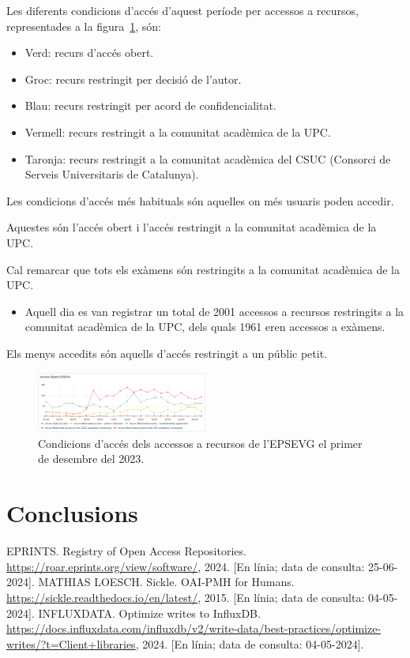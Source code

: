 \documentclass[lettersize,journal]{IEEEtran}
\begin{document}
Les diferents condicions d'accés d'aquest període per accessos a recursos, representades a la figura~\ref{fig:log-access-type}, són:
\begin{itemize}
    \item Verd: recurs d'accés obert.
    \item Groc: recurs restringit per decisió de l'autor.
    \item Blau: recurs restringit per acord de confidencialitat.
    \item Vermell: recurs restringit a la comunitat acadèmica de la UPC.
    \item Taronja: recurs restringit a la comunitat acadèmica del CSUC (Consorci de Serveis Universitaris de Catalunya).
\end{itemize}

Les condicions d'accés més habituals són aquelles on més usuaris poden accedir.

Aquestes són l'accés obert i l'accés restringit a la comunitat acadèmica de la UPC.

Cal remarcar que tots els exàmens són restringits a la comunitat acadèmica de la UPC.
\begin{itemize}
    \item Aquell dia es van registrar un total de 2001 accessos a recursos restringits a la comunitat acadèmica de la UPC, dels quals 1961 eren accessos a exàmens.
\end{itemize}

Els menys accedits són aquells d'accés restringit a un públic petit.

\begin{figure}[!t]
    \centerline{\includegraphics[width=0.5\textwidth]{figures/access-rights-epsevg}}
    \caption{Condicions d'accés dels accessos a recursos de l'EPSEVG el primer de desembre del 2023.}\label{fig:log-access-type}
\end{figure}

\section{Conclusions}\label{sec:conclusions}

\begin{thebibliography}{1}

    EPRINTS. Registry of Open Access Repositories. \url{https://roar.eprints.org/view/software/}, 2024. [En línia; data de consulta: 25-06-2024].
    MATHIAS LOESCH. Sickle. OAI-PMH for Humans. \url{https://sickle.readthedocs.io/en/latest/}, 2015. [En línia; data de consulta: 04-05-2024].
    INFLUXDATA. Optimize writes to InfluxDB. \url{https://docs.influxdata.com/influxdb/v2/write-data/best-practices/optimize-writes/?t=Client+libraries}, 2024. [En línia; data de consulta: 04-05-2024].
\end{thebibliography}
\end{document}
